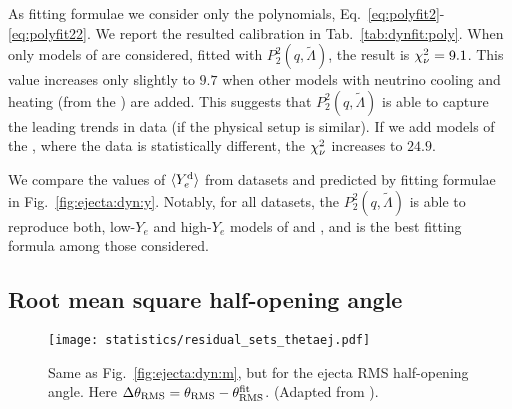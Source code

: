 As fitting formulae we consider only the polynomials, Eq.~\eqref{eq:polyfit2}-\eqref{eq:polyfit22}. 
We report the resulted calibration in Tab.~\ref{tab:dynfit:poly}.
When only models of \DSrefset{} are considered, fitted with $P_2^2(q,\tilde{\Lambda})$, the result is $\chi_{\nu}^2=9.1$. This value increases only slightly to $9.7$ when other models with 
neutrino cooling and heating (from the \DSheatcool{}) are added. 
This suggests that $P_2^2(q,\tilde{\Lambda})$ is able to capture the 
leading trends in data (if the physical setup is similar). If we add models of the \DScool{}, where the data is statistically different, 
the $\chi_{\nu}^2$ increases to $24.9$. 

We compare the values of $\langle Y^{\text{d}}_{e}\rangle$ from datasets and predicted by fitting formulae in 
Fig.~\ref{fig:ejecta:dyn:y}. Notably, for all datasets, the $P_2^2(q,\tilde\Lambda)$ is able to 
reproduce both, low-$Y_e$ and high-$Y_e$ models of \DSheatcool{} and \DSrefset{}, 
and is the best fitting formula among those considered.


\subsection{Root mean square half-opening angle} \label{sec:stat:thetarms}

\begin{figure}[t!]
    \centering 
    \texttt{[image: statistics/residual\_sets\_thetaej.pdf]}
    \caption{
        Same as Fig.~\ref{fig:ejecta:dyn:m}, but for the 
        ejecta \ac{RMS} half-opening angle.
        Here $\Delta \theta_{\rm RMS} = \theta_{\rm RMS} - \theta^{\rm fit}_{\rm RMS}$.
        (Adapted from \citet{Nedora:2020qtd}).
    }
    \label{fig:ejecta:dyn:theta}
\end{figure}

